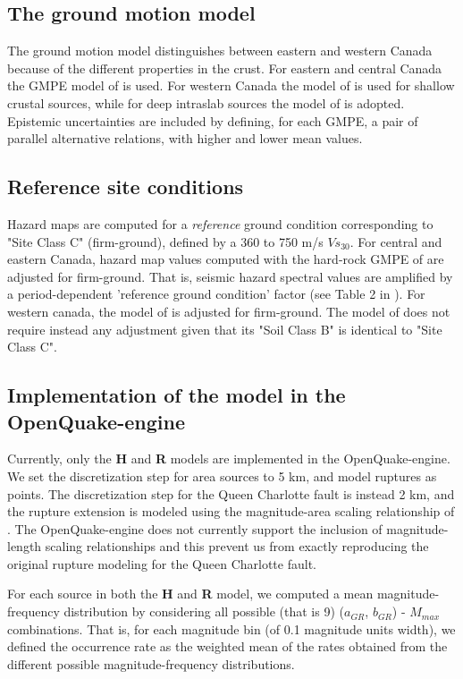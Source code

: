 \subsection{The ground motion model}
The ground motion model distinguishes between eastern and western Canada because of the different properties in the crust. For eastern and central Canada the GMPE model of \citet{ab1995} is used. For western Canada the model of \citet{bjf1993} is used for shallow crustal sources, while for deep intraslab sources the model of \citet{y1997} is adopted. Epistemic uncertainties are included by defining, for each GMPE, a pair of parallel alternative relations, with higher and lower mean values.

\subsection{Reference site conditions}
Hazard maps are computed for a \textit{reference} ground condition corresponding to "Site Class C" (firm-ground), defined by a 360 to 750 m/s $Vs_{30}$. For central and eastern Canada, hazard map values computed with the hard-rock GMPE of \citet{ab1995} are adjusted for firm-ground. That is, seismic hazard spectral values are amplified by a period-dependent 'reference ground condition' factor (see Table 2 in \cite{adams2003}). For western canada, the model of \citet{y1997} is adjusted for firm-ground. The model of \citet{bjf1993} does not require instead any adjustment given that its "Soil Class B" is identical to "Site Class C".

\subsection{Implementation of the model in the OpenQuake-engine}
Currently, only the \textbf{H} and \textbf{R} models are implemented in the OpenQuake-engine. We set the discretization step for area sources to 5 km, and model ruptures as points. The discretization step for the Queen Charlotte fault is instead 2 km, and the rupture extension is modeled using the magnitude-area scaling relationship of \citet{wells1994}. The OpenQuake-engine does not currently support the inclusion of magnitude-length scaling relationships and this prevent us from exactly reproducing the original rupture modeling for the Queen Charlotte fault.

For each source in both the \textbf{H} and \textbf{R} model, we computed a mean magnitude-frequency distribution by considering all possible (that is 9) ($a_{GR}$, $b_{GR}$) - $M_{max}$ combinations. That is, for each magnitude bin (of 0.1 magnitude units width), we defined the occurrence rate as the weighted mean of the rates obtained from the different possible magnitude-frequency distributions.

